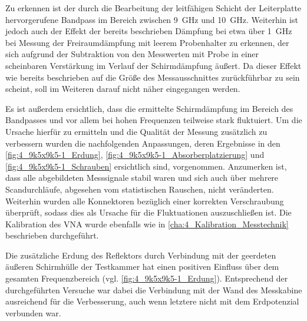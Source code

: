 Zu erkennen ist der durch die Bearbeitung der leitfähigen Schicht der Leiterplatte hervorgerufene Bandpass im Bereich zwischen \SI{9}{\giga\hertz} und \SI{10}{\giga\hertz}. Weiterhin ist jedoch auch der Effekt der bereits beschrieben Dämpfung bei etwa über \SI{1}{\giga\hertz} bei Messung der Freiraumdämpfung mit leerem Probenhalter zu erkennen, der sich aufgrund der Subtraktion von den Messwerten mit Probe in einer scheinbaren Verstärkung im Verlauf der Schirmdämpfung äußert. Da dieser Effekt wie bereits beschrieben auf die Größe des Messausschnittes zurückführbar zu sein scheint, soll im Weiteren darauf nicht näher eingegangen werden. 
\par
\vspace{\linespace}
Es ist außerdem ersichtlich, dass die ermittelte Schirmdämpfung im Bereich des Bandpasses und vor allem bei hohen Frequenzen teilweise stark fluktuiert. Um die Ursache hierfür zu ermitteln und die Qualität der Messung zusätzlich zu verbessern wurden die nachfolgenden Anpassungen, deren Ergebnisse in den \Abbildungen\ref{fig:4_9k5x9k5-1_Erdung}, \ref{fig:4_9k5x9k5-1_Absorberplatzierung} und \ref{fig:4_9k5x9k5-1_Schrauben} ersichtlich sind, vorgenommen. Anzumerken ist, dass alle abgebildeten Messsignale stabil waren und sich auch über mehrere Scandurchläufe, abgesehen vom statistischen Rauschen, nicht veränderten. Weiterhin wurden alle Konnektoren bezüglich einer korrekten Verschraubung überprüft, sodass dies als Ursache für die Fluktuationen auszuschließen ist. Die Kalibration des VNA wurde ebenfalls wie in \Abschnitt\ref{cha:4_Kalibration_Messtechnik} beschrieben durchgeführt. 
\par
\newpage
Die zusätzliche Erdung des Reflektors durch Verbindung mit der geerdeten äußeren Schirmhülle der Testkammer hat einen positiven Einfluss über dem gesamten Frequenzbereich (vgl. \Abb\ref{fig:4_9k5x9k5-1_Erdung}). Entsprechend der durchgeführten Versuche war dabei die Verbindung mit der Wand des Messkabine ausreichend für die Verbesserung, auch wenn letztere nicht mit dem Erdpotenzial verbunden war.  
\par
\vspace{\linespace}

